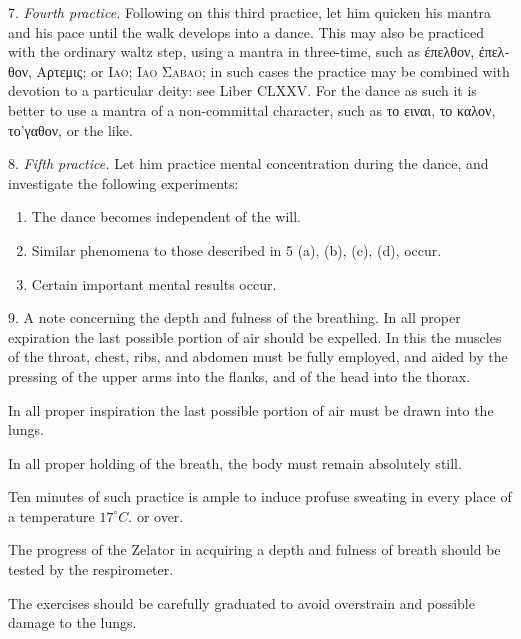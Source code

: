7. \textit{Fourth practice.} Following on this third practice, let him quicken his mantra and his pace until the walk develops into a dance. This may also be practiced with the ordinary waltz step, using a mantra in three-time, such as \textgreek{\'{ε}πελθον}, \textgreek{\'{ε}πελθον}, \textgreek{Αρτεμις}; or \textsc{\textgreek{Ιαο}; \textgreek{Ιαο Σαβαο}}; in such cases the practice may be combined with devotion to a particular deity: see Liber CLXXV. For the dance as such it is better to use a mantra of a non-committal character, such as \textgreek{το} \textgreek{ειναι}, \textgreek{το} \textgreek{καλον}, \textgreek{το’γαθον}, or the like.

8. \textit{Fifth practice.} Let him practice mental concentration during the dance, and investigate the following experiments:

\begin{enumerate}[label=(\alph*)]
\item The dance becomes independent of the will.
\item Similar phenomena to those described in 5 (a), (b), (c), (d), occur.
\item Certain important mental results occur.
\end{enumerate}

9. A note concerning the depth and fulness of the breathing. In all proper expiration the last possible portion of air should be expelled. In this the muscles of the throat, chest, ribs, and abdomen must be fully employed, and aided by the pressing of the upper arms into the flanks, and of the head into the thorax.

In all proper inspiration the last possible portion of air must be drawn into the lungs.

In all proper holding of the breath, the body must remain absolutely still.

Ten minutes of such practice is ample to induce profuse sweating in every place of a temperature $17^{\circ}C.$ or over.

The progress of the Zelator in acquiring a depth and fulness of breath should be tested by the respirometer.

The exercises should be carefully graduated to avoid overstrain and possible damage to the lungs.


